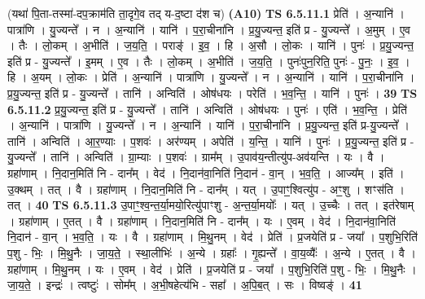 \documentclass[17pt]{extarticle}
\begin{document}
                  \newline
                      (यथा॑ पि॒ता-तस्मा॑-दप॒क्राम॑ति ता॒दृगे॒व तद् य-द॒ष्टा द॑श च)  \textbf{(A10)} \newline \newline
                                \textbf{ TS 6.5.11.1} \newline
                  प्रेति॑ । अ॒न्यानि॑ । पात्रा॑णि । यु॒ज्यन्ते᳚ । न । अ॒न्यानि॑ । यानि॑ । प॒रा॒चीना॑नि । प्र॒यु॒ज्यन्त॒ इति॑ प्र - यु॒ज्यन्ते᳚ । अ॒मुम् । ए॒व । तैः । लो॒कम् । अ॒भीति॑ । ज॒य॒ति॒ । पराङ्॑ । इ॒व॒ । हि । अ॒सौ । लो॒कः । यानि॑ । पुनः॑ । प्र॒यु॒ज्यन्त॒ इति॑ प्र - यु॒ज्यन्ते᳚ । इ॒मम् । ए॒व । तैः । लो॒कम् । अ॒भीति॑ । ज॒य॒ति॒ । पुनः॑पुन॒रिति॒ पुनः॑ - पु॒नः॒ । इ॒व॒ । हि । अ॒यम् । लो॒कः । प्रेति॑ । अ॒न्यानि॑ । पात्रा॑णि । यु॒ज्यन्ते᳚ । न । अ॒न्यानि॑ । यानि॑ । प॒रा॒चीना॑नि । प्र॒यु॒ज्यन्त॒ इति॑ प्र - यु॒ज्यन्ते᳚ । तानि॑ । अन्विति॑ । ओष॑धयः । परेति॑ । भ॒व॒न्ति॒ । यानि॑ । पुनः॑ । \textbf{  39} \newline
                  \newline
                                \textbf{ TS 6.5.11.2} \newline
                  प्र॒यु॒ज्यन्त॒ इति॑ प्र - यु॒ज्यन्ते᳚ । तानि॑ । अन्विति॑ । ओष॑धयः । पुनः॑ । एति॑ । भ॒व॒न्ति॒ । प्रेति॑ । अ॒न्यानि॑ । पात्रा॑णि । यु॒ज्यन्ते᳚ । न । अ॒न्यानि॑ । यानि॑ । प॒रा॒चीना॑नि । प्र॒यु॒ज्यन्त॒ इति॑ प्र-यु॒ज्यन्ते᳚ । तानि॑ । अन्विति॑ । आ॒र॒ण्याः । प॒शवः॑ । अर॑ण्यम् । अपेति॑ । य॒न्ति॒ । यानि॑ । पुनः॑ । प्र॒यु॒ज्यन्त॒ इति॑ प्र - यु॒ज्यन्ते᳚ । तानि॑ । अन्विति॑ । ग्रा॒म्याः । प॒शवः॑ । ग्राम᳚म् । उ॒पाव॑य॒न्तीत्यु॑प-अव॑यन्ति । यः । वै । ग्रहा॑णाम् । नि॒दान॒मिति॑ नि - दान᳚म् । वेद॑ । नि॒दान॑वा॒निति॑ नि॒दान॑ - वा॒न् । भ॒व॒ति॒ । आज्य᳚म् । इति॑ । उ॒क्थम् । तत् । वै । ग्रहा॑णाम् । नि॒दान॒मिति॑ नि - दान᳚म् । यत् । उ॒पाꣳ॒॒श्वित्यु॑प - अꣳ॒॒शु । शꣳस॑ति । तत् । \textbf{  40} \newline
                  \newline
                                \textbf{ TS 6.5.11.3} \newline
                  उ॒पाꣳ॒॒श्व॒न्त॒र्या॒मयो॒रित्यु॑पाꣳशु - अ॒न्त॒र्या॒मयोः᳚ । यत् । उ॒च्चैः । तत् । इत॑रेषाम् । ग्रहा॑णाम् । ए॒तत् । वै । ग्रहा॑णाम् । नि॒दान॒मिति॑ नि - दान᳚म् । यः । ए॒वम् । वेद॑ । नि॒दान॑वा॒निति॑ नि॒दान॑ - वा॒न् । भ॒व॒ति॒ । यः । वै । ग्रहा॑णाम् । मि॒थु॒नम् । वेद॑ । प्रेति॑ । प्र॒जयेति॑ प्र - जया᳚ । प॒शुभि॒रिति॑ प॒शु - भिः॒ । मि॒थु॒नैः । जा॒य॒ते॒ । स्था॒लीभिः॑ । अ॒न्ये । ग्रहाः᳚ । गृ॒ह्यन्ते᳚ । वा॒य॒व्यैः᳚ । अ॒न्ये । ए॒तत् । वै । ग्रहा॑णाम् । मि॒थु॒नम् । यः । ए॒वम् । वेद॑ । प्रेति॑ । प्र॒जयेति॑ प्र - जया᳚ । प॒शुभि॒रिति॑ प॒शु - भिः॒ । मि॒थु॒नैः । जा॒य॒ते॒ । इन्द्रः॑ । त्वष्टुः॑ । सोम᳚म् । अ॒भी॒षहेत्य॑भि - सहा᳚ । अ॒पि॒ब॒त् । सः । विष्वङ्॑ । \textbf{  41} \newline
\end{document}
